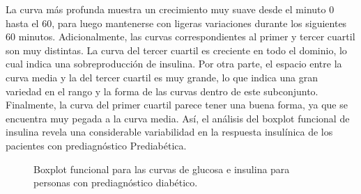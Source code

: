 La curva más profunda muestra un crecimiento muy suave desde el minuto 0 hasta el 60, para luego mantenerse con ligeras variaciones durante los siguientes 60 minutos. Adicionalmente, las curvas correspondientes al primer y tercer cuartil son muy distintas. La curva del tercer cuartil es creciente en todo el dominio, lo cual indica una sobreproducción de insulina. Por otra parte, el espacio entre la curva media y la del tercer cuartil es muy grande, lo que indica una gran variedad en el rango y la forma de las curvas dentro de este subconjunto. Finalmente, la curva del primer cuartil parece tener una buena forma, ya que se encuentra muy pegada a la curva media. Así, el análisis del boxplot funcional de insulina revela una considerable variabilidad en la respuesta insulínica de los pacientes con prediagnóstico Prediabética. 


\begin{figure}[H]
 \centering
    \caption{Boxplot funcional para las curvas de glucosa e insulina para personas con prediagnóstico diabético.}
    \label{fig:bfDiabetes}
\end{figure}

